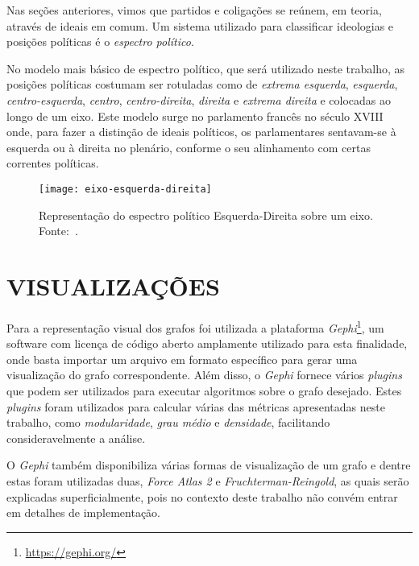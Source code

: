 Nas seções anteriores, vimos que partidos e coligações se reúnem, em teoria, através de ideais em comum. Um sistema utilizado para classificar ideologias e posições políticas é o \emph{espectro político}.

No modelo mais básico de espectro político, que será utilizado neste trabalho, as posições políticas costumam ser rotuladas como de \emph{extrema esquerda}, \emph{esquerda}, \emph{centro-esquerda}, \emph{centro}, \emph{centro-direita}, \emph{direita} e \emph{extrema direita} e colocadas ao longo de um eixo. Este modelo surge no parlamento francês no século XVIII onde, para fazer a distinção de ideais políticos, os parlamentares sentavam-se à esquerda ou à direita no plenário, conforme o seu alinhamento com certas correntes políticas.

\begin{figure}[H]
\texttt{[image: eixo-esquerda-direita]}
\centering
\caption{
    Representação do espectro político Esquerda-Direita sobre um eixo. Fonte:~\cite{matos2016esquerdadireita}.
}
\label{fig:eixo-esquerda-direita}
\end{figure}



\section{\texorpdfstring{\MakeUppercase{Visualizações}}{}}
\label{conceitos__visualizacoes}

Para a representação visual dos grafos foi utilizada a plataforma \emph{Gephi}\footnote{\url{https://gephi.org/}}, um software com licença de código aberto amplamente utilizado para esta finalidade, onde basta importar um arquivo em formato específico para gerar uma visualização do grafo correspondente. Além disso, o \emph{Gephi} fornece vários \emph{plugins} que podem ser utilizados para executar algoritmos sobre o grafo desejado. Estes \emph{plugins} foram utilizados para calcular várias das métricas apresentadas neste trabalho, como \emph{modularidade}, \emph{grau médio} e \emph{densidade}, facilitando consideravelmente a análise.

O \emph{Gephi} também disponibiliza várias formas de visualização de um grafo e dentre estas foram utilizadas duas, \emph{Force Atlas 2} e \emph{Fruchterman-Reingold}, as quais serão explicadas superficialmente, pois no contexto deste trabalho não convém entrar em detalhes de implementação.

